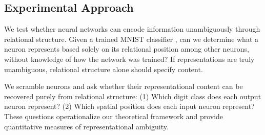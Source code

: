 \subsection{Experimental Approach}

We test whether neural networks can encode information unambiguously through relational structure. Given a trained MNIST classifier \citep{lecun1998mnist}, can we determine what a neuron represents based solely on its relational position among other neurons, without knowledge of how the network was trained? If representations are truly unambiguous, relational structure alone should specify content.

We scramble neurons and ask whether their representational content can be recovered purely from relational structure: (1) Which digit class does each output neuron represent? (2) Which spatial position does each input neuron represent? These questions operationalize our theoretical framework and provide quantitative measures of representational ambiguity.
